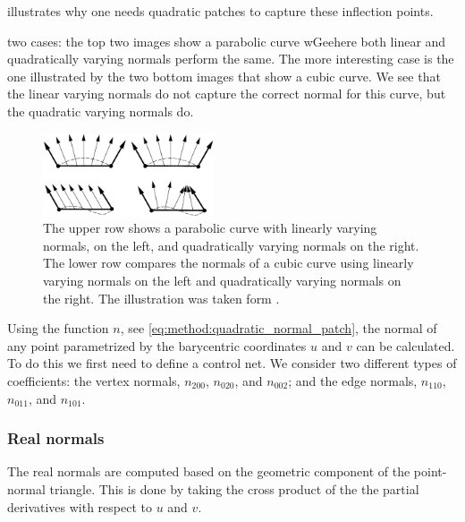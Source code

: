 	 illustrates why one needs quadratic patches to capture these inflection points. 

	two cases: the top two images show a parabolic curve wGeehere both linear and quadratically varying normals perform the same. The more interesting case is the one illustrated by the two bottom images that show a cubic curve. We see that the linear varying normals do not capture the correct normal for this curve, but the quadratic varying normals do.

	\begin{figure}
		\centering
		\includegraphics[width=0.45\textwidth]{./content/img/method/lin_vs_quad_varying_normals(inspiration).png}
		\caption{The upper row shows a parabolic curve with linearly varying normals, on the left, and quadratically varying normals on the right. The lower row compares the normals of a cubic curve using linearly varying normals on the left and quadratically varying normals on the right. The illustration was taken form \textcite{van1997phong}.}
		\label{fig:method:linear_vs_quadratically_varying}
	\end{figure}

	Using the function $n$, see \eqref{eq:method:quadratic_normal_patch}, the normal of any point parametrized by the barycentric coordinates $u$ and $v$ can be calculated. To do this we first need to define a control net. We consider two different types of coefficients: the vertex normals, $n_{200}$, $n_{020}$, and $n_{002}$; and the edge normals, $n_{110}$, $n_{011}$, and $n_{101}$. 

\subsubsection{Real normals}
\label{sss:method:normals:realNormals}
		The real normals are computed based on the geometric component of the point-normal triangle. This is done by taking the cross product of the the partial derivatives with respect to $u$ and $v$. 

